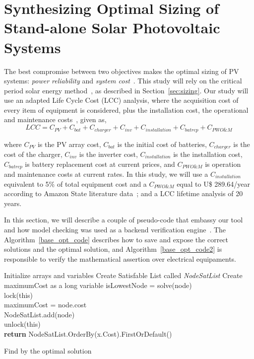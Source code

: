 \documentclass[10pt,journal,compsoc]{IEEEtran}
\begin{document}
\section{Synthesizing Optimal Sizing of Stand-alone Solar Photovoltaic Systems}

The best compromise between two objectives makes the optimal sizing of PV systems: \textit{power reliability} and \textit{system cost}~\cite{Alsadi2018}. This study will rely on the critical period solar energy method~\cite{Pinho}, as described in Section~\ref{sec:sizing}. Our study will use an adapted Life Cycle Cost (LCC) analysis, where the acquisition cost of every item of equipment is considered, plus the installation cost, the operational and maintenance costs~\cite{Alsadi2018}, given as,
%
\begin{equation}
\label{eq:LCC}
LCC = C_{PV} + C_{bat} + C_{charger} + C_{inv} + C_{installation} + C_{batrep} + C_{PWO\&M}
\end{equation}

\noindent where $C_{PV}$ is the PV array cost, $C_{bat}$ is the initial cost of batteries, $C_{charger}$ is the cost of the charger, $C_{inv}$ is the inverter cost, $C_{installation}$ is the installation cost, $C_{batrep}$ is battery replacement cost at current prices, and $C_{PWO\&M}$ is operation and maintenance costs at current rates. In this study, we will use a $C_{installation}$ equivalent to 5\% of total equipment cost and a $C_{PWO\&M}$ equal to U\$ 289.64/year according to Amazon State literature data~\cite{Agrener2013}; and a LCC lifetime analysis of 20 years.

\color{blue} In this section, we will describe a couple of pseudo-code that embassy our tool and how model checking was used as a backend verification engine~\cite{DBLP:journals/corr/abs-1909-13139}. The Algorithm~\ref{base_opt_code} describes how to save and expose the correct solutions and the optimal solution, and Algorithm~\ref{base_opt_code2} is responsible to verify the mathematical assertion over electrical equipaments.\\

\begin{algorithm}[h]
\SetAlgoLined
{}
Initialize arrays and variables\;
Create Satisfable List called \textit{NodeSatList}\;
Create maximumCost as a long variable\;
{%
    isLowestNode = solve(node)\\
     {
        lock(this)\\
        maximumCost = node.cost \\
        NodeSatList.add(node)\\
        unlock(this)\\
    }
}
\textbf {return} NodeSatList.OrderBy(x.Cost).FirstOrDefault()
\caption{Find by the optimal solution}
\label{base_opt_code}
\end{algorithm}
\end{document}
